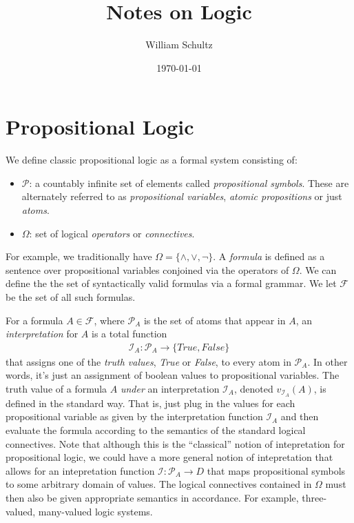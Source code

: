 \documentclass[10pt]{article}
\begin{document}
\title{Notes on Logic}
\author{William Schultz}
\date{\today}

\maketitle

\newcommand{\propvars}{{\mathcal{P}}}
\newcommand{\A}{\forall}
\newcommand{\E}{\exists}

\section{Propositional Logic}

We define classic propositional logic \cite{2021benari} as a formal system consisting of: 
\begin{itemize}
    \item $\propvars$: a countably infinite set of elements called \textit{propositional symbols}. These are alternately referred to as \textit{propositional variables}, \textit{atomic propositions} or just \textit{atoms}.
    \item $\Omega$: set of logical \textit{operators} or \textit{connectives}.
\end{itemize}
For example, we traditionally have $\Omega=\{\wedge, \vee, \neg\}$. A \textit{formula} is defined as a sentence over propositional variables conjoined via the operators of $\Omega$. We can define the the set of syntactically valid formulas via a formal grammar. We let $\mathcal{F}$ be the set of all such formulas. 

\newcommand{\interp}{\mathcal{I}}

For a formula $A \in \mathcal{F}$, where $\propvars_A$ is the set of atoms that appear in $A$,  an \textit{interpretation} for $A$ is a total function
\begin{align*}
    \mathcal{I}_A : \propvars_A \rightarrow \{True,False\}
\end{align*}
that assigns one of the \textit{truth values}, \textit{True} or \textit{False}, to every atom in $\propvars_A$. In other words, it's just an assignment of boolean values to propositional variables.  The truth value of a formula $A$ \textit{under} an interpretation $\mathcal{I}_A$, denoted $v_{\mathcal{I}_{A}}(A)$, is defined in the standard way. That is, just plug in the values for each propositional variable as given by the interpretation function $\mathcal{I}_A$ and then evaluate the formula according to the semantics of the standard logical connectives. Note that although this is the ``classical'' notion of intepretation for propositional logic, we could have a more general notion of intepretation that allows for an intepretation function $\mathcal{I} : \mathcal{P}_A \rightarrow D$ that maps propositional symbols to some arbitrary domain of values. The logical connectives contained in $\Omega$ must then also be given appropriate semantics in accordance. For example, three-valued, many-valued logic systems. 
\end{document}
